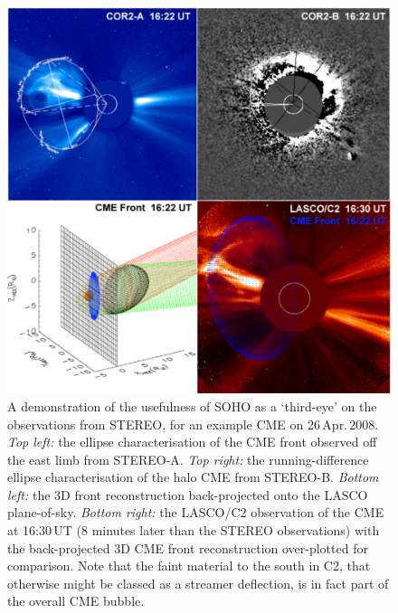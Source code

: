 \documentclass[preprint2]{aastex}
\begin{document}
\begin{figure}[!ht]
\centerline{\includegraphics[width=\linewidth]{images/backproj.pdf}}
\caption{A demonstration of the usefulness of SOHO as a `third-eye' on the observations from STEREO, for an example CME on 26\,Apr.\,2008. \emph{Top left:} the ellipse characterisation of the CME front observed off the east limb from STEREO-A. \emph{Top right:} the running-difference ellipse characterisation of the halo CME from STEREO-B. \emph{Bottom left:} the 3D front reconstruction back-projected onto the LASCO plane-of-sky. \emph{Bottom right:} the LASCO/C2 observation of the CME at 16:30\,UT (8 minutes later than the STEREO observations) with the back-projected 3D CME front reconstruction over-plotted for comparison. Note that the faint material to the south in C2, that otherwise might be classed as a streamer deflection, is in fact part of the overall CME bubble.}
\label{backproj}
\end{figure}
\end{document}
